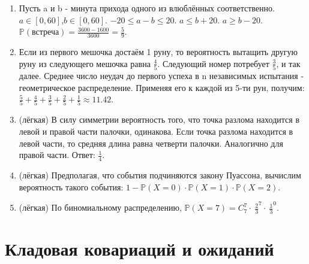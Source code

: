 \documentclass[a4paper,12pt]{article}
\def \P{\mathbb{P}}
\begin{document}
\begin{enumerate}
\item
Пусть a и b - минута прихода одного из влюблённых соответственно. $a\in[0,60]$,$b\in[0,60]$.
$-20\le a-b \le20$.
\newline $a \le b+20$. $a \ge b-20$. \newline $\P(\text{встреча})=\frac{3600-1600}{3600}=\frac{5}{9}$.
\item
Если из первого мешочка достаём 1 руну, то вероятность вытащить другую руну из следующего мешочка равна $\frac{4}{5}$. Следующий номер потребует $\frac{3}{5}$, и так далее. Среднее число неудач до первого успеха в n независимых испытания - геометрическое распределение. Применяя его к каждой из 5-ти рун, получим:
    $\frac{5}{5}+\frac{4}{5}+\frac{3}{5}+\frac{2}{5}+\frac{1}{5}\approx 11.42$.
\item (лёгкая)
В силу симметрии вероятность того, что точка разлома находится в левой и правой части палочки, одинакова.
Если точка разлома находится в левой части, то средняя длина равна четверти палочки.
Аналогично для правой части. Ответ: $\frac{1}{4}$.
\item (лёгкая)
Предполагая, что события подчиняются закону Пуассона, вычислим вероятность
такого события: $1-\P(X=0)\cdot \P(X=1)\cdot \P(X=2)$.
\item (лёгкая)
По биномиальному распределению,
$\P(X=7)=C^7_7\cdot\ {\frac{2}{3}}^7\cdot \ {\frac{1}{3}}^0$.
\end{enumerate}

\newpage
\section{Кладовая ковариаций и ожиданий}
\end{document}
